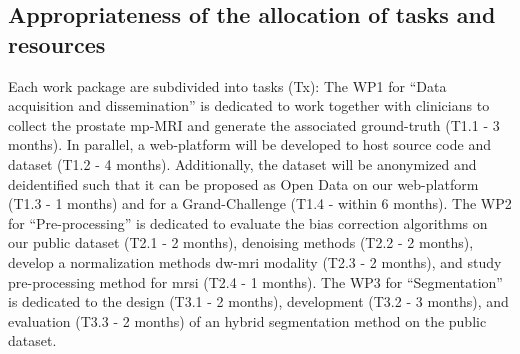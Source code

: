 \subsection{Appropriateness of the allocation of tasks and resources}

Each work package are subdivided into tasks (Tx):
The WP1 for ``Data acquisition and dissemination'' is dedicated to work together with clinicians to collect the prostate mp-MRI and generate the associated ground-truth (T1.1 - 3 months).
In parallel, a web-platform will be developed to host source code and dataset (T1.2 - 4 months).
Additionally, the dataset will be anonymized and deidentified such that it can be proposed as Open Data on our web-platform (T1.3 - 1 months) and for a Grand-Challenge (T1.4 - within 6 months).
The WP2 for ``Pre-processing'' is dedicated to evaluate the bias correction algorithms on our public dataset (T2.1 - 2 months), denoising methods (T2.2 - 2 months), develop a normalization methods \ac{dw}-\ac{mri} modality (T2.3 - 2 months), and study pre-processing method for \ac{mrsi} (T2.4 - 1 months).
The WP3 for ``Segmentation'' is dedicated to the design (T3.1 - 2 months), development (T3.2 - 3 months), and evaluation (T3.3 - 2 months) of an hybrid segmentation method on the public dataset.
